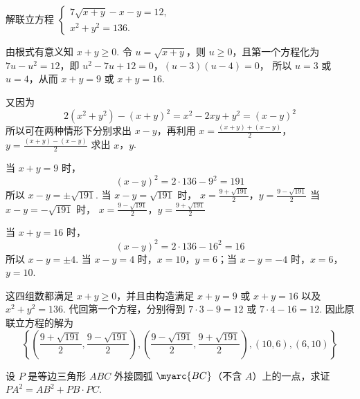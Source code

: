 \documentclass[UTF8,a4paper,oneside,11pt]{ctexbook}
\begin{document}
\begin{problem}
解联立方程 \(\begin{cases}
7\sqrt{x+y}-x-y=12,\\
x^{2}+y^{2}=136.
\end{cases}\)
\end{problem}

\begin{solution}
由根式有意义知 \(x+y\geq0\). 令 \(u=\sqrt{x+y}\)，则 \(u\geq0\)，且第一个方程化为 \(7u-u^{2}=12\)，即
\(u^{2}-7u+12=0\)，\(\left(u-3\right)\left(u-4\right)=0\)，
所以 \(u=3\) 或 \(u=4\)，从而 \(x+y=9\) 或 \(x+y=16\).

又因为
\[
2\left(x^{2}+y^{2}\right)-\left(x+y\right)^{2}=x^{2}-2xy+y^{2}=\left(x-y\right)^{2}
\]
所以可在两种情形下分别求出 \(x-y\)，再利用 \(x=\frac{(x+y)+(x-y)}{2}\)，\(y=\frac{(x+y)-(x-y)}{2}\) 求出 \(x\)，\(y\).

当 \(x+y=9\) 时，
\[
\left(x-y\right)^{2}=2\cdot136-9^{2}=191
\]
所以 \(x-y=\pm\sqrt{191}\). 当 \(x-y=\sqrt{191}\) 时，
\(x=\frac{9+\sqrt{191}}{2}\)，\(y=\frac{9-\sqrt{191}}{2}\)
当 \(x-y=-\sqrt{191}\) 时，
\(x=\frac{9-\sqrt{191}}{2}\)，\(y=\frac{9+\sqrt{191}}{2}\)

当 \(x+y=16\) 时，
\[
\left(x-y\right)^{2}=2\cdot136-16^{2}=16
\]
所以 \(x-y=\pm4\). 当 \(x-y=4\) 时，\(x=10\)，\(y=6\)；当 \(x-y=-4\) 时，\(x=6\)，\(y=10\).

这四组数都满足 \(x+y\geq0\)，并且由构造满足 \(x+y=9\) 或 \(x+y=16\) 以及 \(x^{2}+y^{2}=136\). 代回第一个方程，分别得到 \(7\cdot3-9=12\) 或 \(7\cdot4-16=12\). 因此原联立方程的解为
\[
\left\{
\left(\frac{9+\sqrt{191}}{2},\frac{9-\sqrt{191}}{2}\right),
\left(\frac{9-\sqrt{191}}{2},\frac{9+\sqrt{191}}{2}\right),
(10,6),(6,10)
\right\}
\]
\end{solution}

\begin{problem}
设 \(P\) 是等边三角形 \(ABC\) 外接圆弧 \(\myarc{BC}\)（不含 \(A\)）上的一点，求证 \(PA^{2}=AB^{2}+PB\cdot PC\).
\end{problem}
\end{document}
